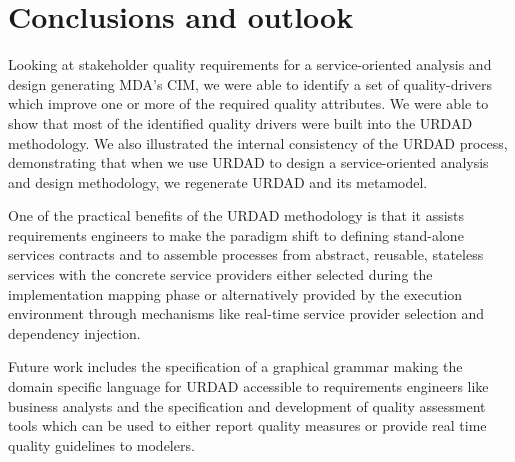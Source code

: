 \section{Conclusions and outlook}

Looking at stakeholder quality requirements for a service-oriented analysis and design generating MDA's CIM, we were able to identify a set of quality-drivers which improve one or more of the required quality attributes. We were able to show that most of the identified quality drivers were built into the URDAD methodology. We also illustrated the internal consistency of the URDAD process, demonstrating that when we use URDAD to design a service-oriented analysis and design methodology, we regenerate URDAD and its metamodel.

One of the practical benefits of the URDAD methodology is that it assists requirements engineers to make the paradigm shift\cite{haines_impact_2007} to defining stand-alone services contracts and to assemble processes from abstract, reusable, stateless services with the concrete service providers either selected during the implementation mapping phase or alternatively provided by the execution environment through mechanisms like real-time service provider selection and dependency injection.

Future work includes the specification of a graphical grammar making the domain specific language for URDAD accessible to requirements engineers like business analysts and the specification and development of quality assessment tools which can be used to either report quality measures or provide real time quality guidelines to modelers.